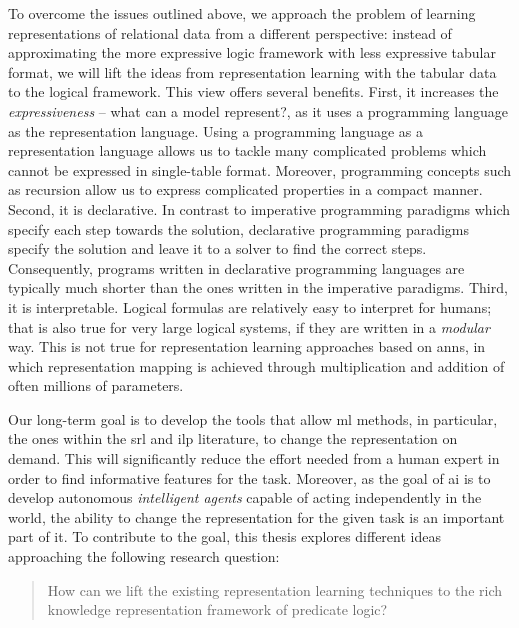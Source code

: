 To overcome the issues outlined above, we approach the problem of learning representations of relational data from a different perspective: instead of approximating the more expressive logic framework with less expressive tabular format, we will lift the ideas from representation learning with the tabular data to the logical framework.
This view offers several benefits.
First, it  increases the \textit{expressiveness} -- what can a model represent?,  as it uses a programming language as the representation language.
Using a programming language as a representation language allows us to tackle many complicated problems which cannot be expressed in single-table format.
Moreover, programming concepts such as recursion allow us to express complicated properties in a compact manner.
Second, it is declarative.
In contrast to imperative programming paradigms which specify each step towards the solution, declarative programming paradigms specify the solution and leave it to a solver to find the correct steps.
Consequently, programs written in declarative programming languages are typically much shorter than the ones written in the imperative paradigms.
Third, it is interpretable.
Logical formulas are relatively easy to interpret for humans; that is also true for very large logical systems, if they are written in a \textit{modular} way.
This is not true for representation learning approaches based on \gls{ann}s, in which representation mapping is achieved through multiplication and addition of often millions of parameters.



Our long-term goal is to develop the tools that allow \gls{ml} methods, in particular, the ones within the \gls{srl} and \gls{ilp} literature, to change the representation on demand.
This will significantly reduce the effort needed from a human expert in order to find informative features for the task.
Moreover, as the goal of \gls{ai} is to develop autonomous \textit{intelligent agents} \cite{Russell:2009:AIM:1671238} capable of acting independently in the world, the ability to change the representation for the given task is an important part of it.
To contribute to the goal, this thesis explores different ideas approaching the following research question:

\begin{quote}
	How can we lift the existing representation learning techniques to the rich knowledge representation framework of predicate logic?
\end{quote}


